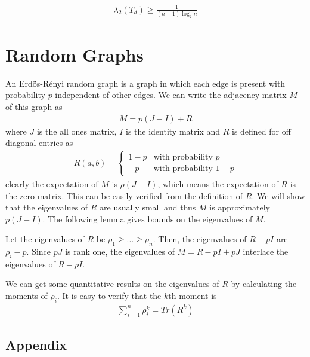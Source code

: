 \documentclass{math}
\begin{document}
\begin{lemma}
    \begin{align*}
        \lambda_2(T_d) \geq \frac{1}{(n - 1) \log_2 n}
    \end{align*}
\end{lemma}

\section{Random Graphs}

An Erd\"{o}s-R\'{e}nyi random graph is a graph in which each edge is present with probability $p$ independent of other edges.
We can write the adjacency matrix $M$ of this graph as
\begin{align*}
    M = p(J - I) + R
\end{align*}
where $J$ is the all ones matrix, $I$ is the identity matrix and $R$ is defined for off diagonal entries as
\begin{align*}
    R(a, b) = \begin{cases}
                  1 - p & \text{with probability $p$}   \\
                  -p    & \text{with probability $1-p$}
              \end{cases}
\end{align*}
clearly the expectation of $M$ is $\rho(J - I)$, which means the expectation of $R$ is the zero matrix.
This can be easily verified from the definition of $R$. We will show that the eigenvalues of $R$ are usually small
and thus $M$ is approximately $p(J - I)$. The following lemma gives bounds on the eigenvalues of $M$.

\begin{lemma}
    Let the eigenvalues of $R$ be $\rho_1 \geq ... \geq \rho_n$.
    Then, the eigenvalues of $R - pI$ are $\rho_i - p$.
    Since $pJ$ is rank one, the eigenvalues of $M = R - pI + pJ$ interlace the eigenvalues of $R - pI$.
\end{lemma}

We can get some quantitative results on the eigenvalues of $R$ by calculating the moments of $\rho_i$.
It is easy to verify that the $k$th moment is
\begin{align*}
    \sum_{i=1}^{n} \rho_i^k = Tr(R^k)
\end{align*}

\subsection{Appendix}
\end{document}
